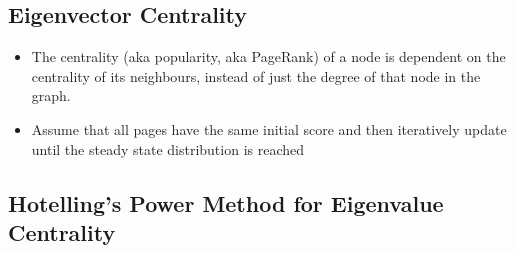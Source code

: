 \documentclass{article}
\begin{document}
\subsection{Eigenvector Centrality}
\begin{itemize}
    \item The centrality (aka popularity, aka PageRank) of a node is dependent on the centrality of its neighbours, instead of just the degree of that node in the graph.
    
    \item Assume that all pages have the same initial score and then iteratively update until the steady state distribution is reached
\end{itemize}

\subsection{Hotelling's Power Method for Eigenvalue Centrality}
\end{document}
